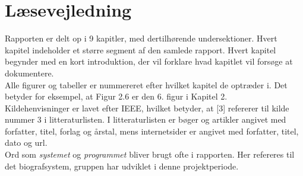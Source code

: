 \newpage
\section*{Læsevejledning}
Rapporten er delt op i 9 kapitler, med dertilhørende undersektioner. Hvert kapitel indeholder et større segment af den samlede rapport.
Hvert kapitel begynder med en kort introduktion, der vil forklare hvad kapitlet vil forsøge at dokumentere.\\ 

Alle figurer og tabeller er nummereret efter hvilket kapitel de optræder i. Det betyder for eksempel, at Figur 2.6 er den 
6. figur i Kapitel 2. \\

Kildehenvisninger er lavet efter IEEE, hvilket betyder, at [3] refererer til kilde nummer 3 i litteraturlisten. 
I litteraturlisten er bøger og artikler angivet med forfatter, titel, forlag og årstal, mens internetsider er angivet med forfatter, titel, dato og url. \\ 

Ord som \textit{systemet} og \textit{programmet} bliver brugt ofte i rapporten. Her refereres til det biografsystem, gruppen har udviklet i denne projektperiode.